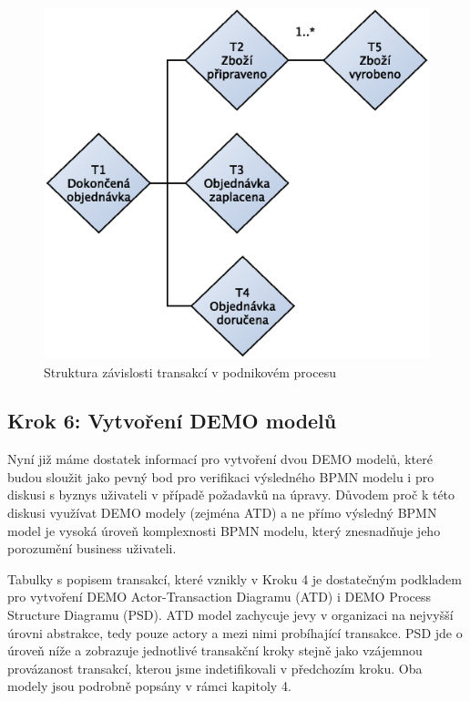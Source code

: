 \documentclass[]{article}
\begin{document}
\begin{figure}[H]\centering
\includegraphics[width=1.0\textwidth]{obrazky/result-structure-chart}
\caption{Struktura závislosti transakcí v podnikovém procesu}
\label{fig:result_structure_chart}
\end{figure}

\subsection{Krok 6: Vytvoření DEMO modelů}
Nyní již máme dostatek informací pro vytvoření dvou DEMO modelů, které budou sloužit jako pevný bod pro verifikaci výsledného BPMN modelu i pro diskusi s byznys uživateli v případě požadavků na úpravy. Důvodem proč k této diskusi využívat DEMO modely (zejména ATD) a ne přímo výsledný BPMN model je vysoká úroveň komplexnosti BPMN modelu, který znesnadňuje jeho porozumění business uživateli.

Tabulky s popisem transakcí, které vznikly v Kroku 4 je dostatečným podkladem pro vytvoření DEMO Actor-Transaction Diagramu (ATD) i DEMO Process Structure Diagramu (PSD). ATD model zachycuje jevy v organizaci na nejvyšší úrovni abstrakce, tedy pouze actory a mezi nimi probíhající transakce. PSD jde o úroveň níže a zobrazuje jednotlivé transakční kroky stejně jako vzájemnou provázanost transakcí, kterou jsme indetifikovali v předchozím kroku. Oba modely jsou podrobně popsány v rámci kapitoly 4.
\end{document}
